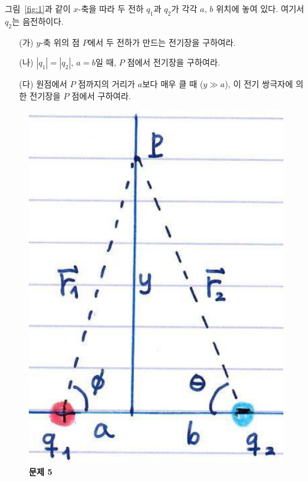 \documentclass[tightenlines,floatfix,nofootinbib,superscriptaddress,fleqn]{revtex4-2}
\begin{document}
그림~\ref{fig:1}과 같이 $x$-축을 따라 두 전하 $q_1$과 $q_2$가 각각
$a$, $b$ 위치에 놓여 있다. 여기서 $q_2$는 음전하이다. 
\begin{itemize}
\item[(가)] $y$-축 위의 점 $P$에서 두 전하가 만드는 전기장을
  구하여라. 
\item[(나)] $|q_1|=|q_2|$, $a=b$일 때, $P$ 점에서 전기장을 구하여라. 
\item[(다)] 원점에서 $P$ 점까지의 거리가 $a$보다 매우 클 때 ($y\gg
  a$), 이 전기 쌍극자에 의한 전기장을 $P$ 점에서 구하여라. 
\end{itemize}
\begin{figure}[htp]
  \centering
  \includegraphics[scale=0.4]{Qfig20220829-1.pdf}
  \caption{\textbf{문제 5}}
  \label{fig:3}
\end{figure}
\vspace{1.cm}
\end{document}
